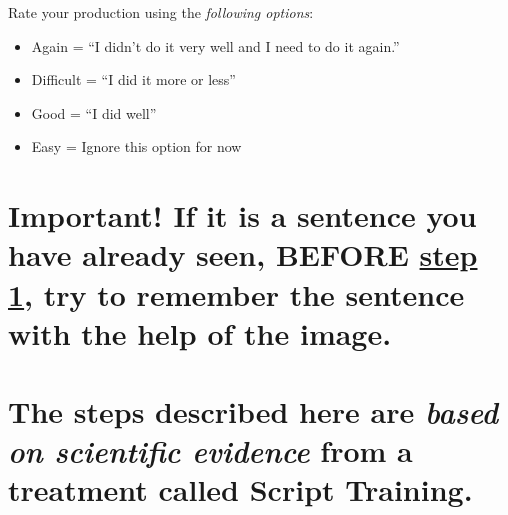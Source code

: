 \documentclass[
]{book}
\begin{document}
Rate your production using the \emph{following options}:

\begin{itemize}
\item
  Again = ``I didn't do it very well and I need to do it again.''
\item
  Difficult = ``I did it more or less''
\item
  Good = ``I did well''
\item
  Easy = Ignore this option for now
\end{itemize}

\hypertarget{important-if-it-is-a-sentence-you-have-already-seen-before-step-1-try-to-remember-the-sentence-with-the-help-of-the-image.}{%
\section{\texorpdfstring{Important! If it is a sentence you have \textbf{already} seen, BEFORE \protect\hyperlink{cross_6}{step 1}, try to remember the sentence with the help of the image.}{Important! If it is a sentence you have already seen, BEFORE step 1, try to remember the sentence with the help of the image.}}\label{important-if-it-is-a-sentence-you-have-already-seen-before-step-1-try-to-remember-the-sentence-with-the-help-of-the-image.}}

\hypertarget{the-steps-described-here-are-based-on-scientific-evidence-from-a-treatment-called-script-training.}{%
\section{\texorpdfstring{The steps described here are \emph{based on scientific evidence} from a treatment called Script Training.}{The steps described here are based on scientific evidence from a treatment called Script Training.}}\label{the-steps-described-here-are-based-on-scientific-evidence-from-a-treatment-called-script-training.}}

  
\end{document}
